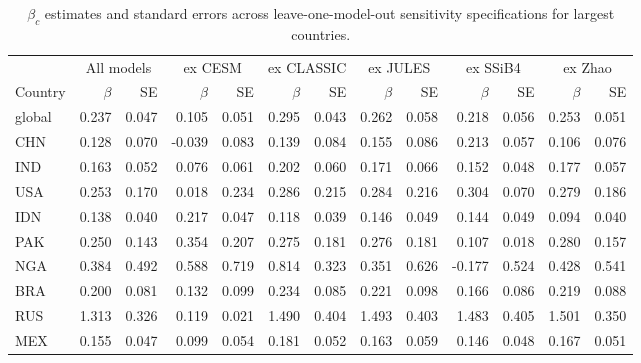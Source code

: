 \begin{table}[ht]
\centering
\caption{$\beta_c$ estimates and standard errors across leave-one-model-out sensitivity specifications for largest countries.} 
\label{tab:beta_select}
\begin{tabular}{lrrrrrrrrrrrr}
  \toprule
   & \multicolumn{2}{c}{All models} & \multicolumn{2}{c}{ex CESM} & \multicolumn{2}{c}{ex CLASSIC} & \multicolumn{2}{c}{ex JULES} & \multicolumn{2}{c}{ex SSiB4} & \multicolumn{2}{c}{ex Zhao} \\
\cmidrule(lr){2-3}\cmidrule(lr){4-5}\cmidrule(lr){6-7}\cmidrule(lr){8-9}\cmidrule(lr){10-11}\cmidrule(lr){12-13}
Country & $\beta$ & SE & $\beta$ & SE & $\beta$ & SE & $\beta$ & SE & $\beta$ & SE & $\beta$ & SE \\
\midrule
 \midrule
global & 0.237 & 0.047 & 0.105 & 0.051 & 0.295 & 0.043 & 0.262 & 0.058 & 0.218 & 0.056 & 0.253 & 0.051 \\ 
  CHN & 0.128 & 0.070 & -0.039 & 0.083 & 0.139 & 0.084 & 0.155 & 0.086 & 0.213 & 0.057 & 0.106 & 0.076 \\ 
  IND & 0.163 & 0.052 & 0.076 & 0.061 & 0.202 & 0.060 & 0.171 & 0.066 & 0.152 & 0.048 & 0.177 & 0.057 \\ 
  USA & 0.253 & 0.170 & 0.018 & 0.234 & 0.286 & 0.215 & 0.284 & 0.216 & 0.304 & 0.070 & 0.279 & 0.186 \\ 
  IDN & 0.138 & 0.040 & 0.217 & 0.047 & 0.118 & 0.039 & 0.146 & 0.049 & 0.144 & 0.049 & 0.094 & 0.040 \\ 
  PAK & 0.250 & 0.143 & 0.354 & 0.207 & 0.275 & 0.181 & 0.276 & 0.181 & 0.107 & 0.018 & 0.280 & 0.157 \\ 
  NGA & 0.384 & 0.492 & 0.588 & 0.719 & 0.814 & 0.323 & 0.351 & 0.626 & -0.177 & 0.524 & 0.428 & 0.541 \\ 
  BRA & 0.200 & 0.081 & 0.132 & 0.099 & 0.234 & 0.085 & 0.221 & 0.098 & 0.166 & 0.086 & 0.219 & 0.088 \\ 
  RUS & 1.313 & 0.326 & 0.119 & 0.021 & 1.490 & 0.404 & 1.493 & 0.403 & 1.483 & 0.405 & 1.501 & 0.350 \\ 
  MEX & 0.155 & 0.047 & 0.099 & 0.054 & 0.181 & 0.052 & 0.163 & 0.059 & 0.146 & 0.048 & 0.167 & 0.051 \\ 
   \bottomrule
\end{tabular}
\end{table}
